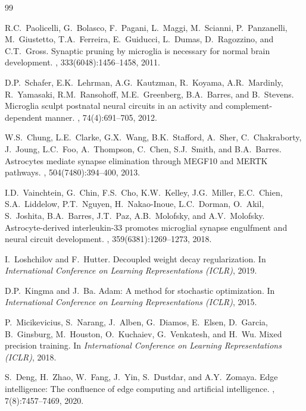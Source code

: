 \documentclass[11pt, a4paper]{article}
\begin{document}
\begin{thebibliography}{99}

R.C.~Paolicelli, G.~Bolasco, F.~Pagani, L.~Maggi, M.~Scianni, P.~Panzanelli, M.~Giustetto, T.A.~Ferreira, E.~Guiducci, L.~Dumas, D.~Ragozzino, and C.T.~Gross.
\newblock Synaptic pruning by microglia is necessary for normal brain development.
, 333(6048):1456--1458, 2011.

D.P.~Schafer, E.K.~Lehrman, A.G.~Kautzman, R.~Koyama, A.R.~Mardinly, R.~Yamasaki, R.M.~Ransohoff, M.E.~Greenberg, B.A.~Barres, and B.~Stevens.
\newblock Microglia sculpt postnatal neural circuits in an activity and complement-dependent manner.
, 74(4):691--705, 2012.

W.S.~Chung, L.E.~Clarke, G.X.~Wang, B.K.~Stafford, A.~Sher, C.~Chakraborty, J.~Joung, L.C.~Foo, A.~Thompson, C.~Chen, S.J.~Smith, and B.A.~Barres.
\newblock Astrocytes mediate synapse elimination through MEGF10 and MERTK pathways.
, 504(7480):394--400, 2013.

I.D.~Vainchtein, G.~Chin, F.S.~Cho, K.W.~Kelley, J.G.~Miller, E.C.~Chien, S.A.~Liddelow, P.T.~Nguyen, H.~Nakao-Inoue, L.C.~Dorman, O.~Akil, S.~Joshita, B.A.~Barres, J.T.~Paz, A.B.~Molofsky, and A.V.~Molofsky.
\newblock Astrocyte-derived interleukin-33 promotes microglial synapse engulfment and neural circuit development.
, 359(6381):1269--1273, 2018.


I.~Loshchilov and F.~Hutter.
\newblock Decoupled weight decay regularization.
\newblock In {\em International Conference on Learning Representations (ICLR)}, 2019.

D.P.~Kingma and J.~Ba.
\newblock Adam: A method for stochastic optimization.
\newblock In {\em International Conference on Learning Representations (ICLR)}, 2015.

P.~Micikevicius, S.~Narang, J.~Alben, G.~Diamos, E.~Elsen, D.~Garcia, B.~Ginsburg, M.~Houston, O.~Kuchaiev, G.~Venkatesh, and H.~Wu.
\newblock Mixed precision training.
\newblock In {\em International Conference on Learning Representations (ICLR)}, 2018.


S.~Deng, H.~Zhao, W.~Fang, J.~Yin, S.~Dustdar, and A.Y.~Zomaya.
\newblock Edge intelligence: The confluence of edge computing and artificial intelligence.
, 7(8):7457--7469, 2020.


\end{thebibliography}
\end{document}
